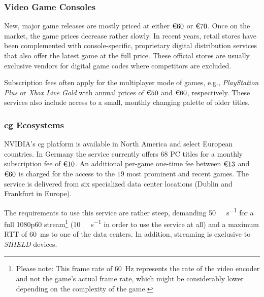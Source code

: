 



\subsubsection{Video Game Consoles}

New, major game releases are mostly priced at either
$\text{\texteuro} 60$ or $\text{\texteuro} 70$. Once on the market, the
game prices decrease rather slowly. In recent years, retail stores have
been complemented with console-specific, proprietary digital
distribution services that also offer the latest game at the full price.
These official stores are usually exclusive vendors for digital game
codes where competitors are excluded.

Subscription fees often apply for the multiplayer mode of games, e.g.,
\textit{PlayStation Plus} or \textit{Xbox Live Gold} with annual prices
of $\text{\texteuro} 50$ and $\text{\texteuro} 60$, respectively. These
services also include access to a small, monthly changing palette of
older titles.




\subsubsection{\Gls{cg} Ecosystems}


NVIDIA's \gls{cg} platform%
\gfnow
is available in North America and select European countries.
In Germany the service currently offers $68$ PC titles
for a monthly subscription fee of $\text{\texteuro} 10$. An additional
per-game one-time fee between $\text{\texteuro} 13$ and
$\text{\texteuro} 60$ is charged for the access to the $19$ most
prominent and recent games. The service is delivered from six
specialized data center locations (Dublin and Frankfurt in Europe).

The requirements to use this service are rather steep, demanding
\SI{50}{\mega\bit\per\second} for a full
1080p60 stream\footnote{\label{foot:rate}Please note: This frame rate of
\SI{60}{\hertz} represents the rate of the video encoder and not the
game's actual frame rate, which might be considerably lower depending on
the complexity of the game.} (\SI{10}{\mega\bit\per\second} in
order to use the service at all) and a maximum \acrshort{RTT} of
\SI{60}{\milli\second} to one of the data centers. In addition,
streaming is exclusive to \textit{SHIELD} devices.

